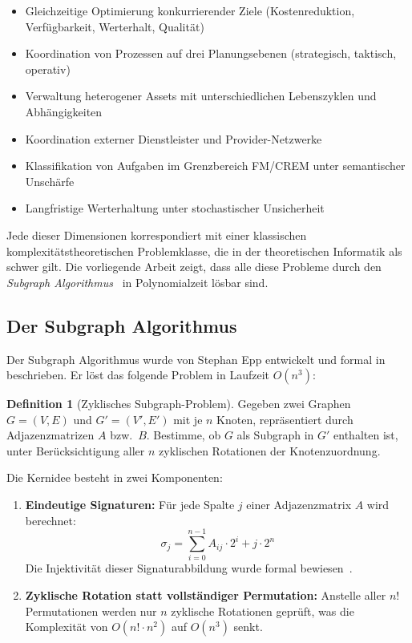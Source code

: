 ﻿\documentclass[a4paper,12pt]{article}
\theoremstyle{definition}
\newtheorem{definition}{Definition}[section]
\begin{document}
\begin{itemize}
    \item Gleichzeitige Optimierung konkurrierender Ziele (Kostenreduktion, Verfügbarkeit,
          Werterhalt, Qualität)
    \item Koordination von Prozessen auf drei Planungsebenen (strategisch, taktisch, operativ)
    \item Verwaltung heterogener Assets mit unterschiedlichen Lebenszyklen und Abhängigkeiten
    \item Koordination externer Dienstleister und Provider-Netzwerke
    \item Klassifikation von Aufgaben im Grenzbereich FM/CREM unter semantischer Un\-schärfe
    \item Langfristige Werterhaltung unter stochastischer Unsicherheit
\end{itemize}

Jede dieser Dimensionen korrespondiert mit einer klassischen komplexitätstheoretischen
Problemklasse, die in der theoretischen Informatik als schwer gilt.
Die vorliegende Arbeit zeigt, dass alle diese Probleme durch den
\emph{Subgraph Algorithmus}~\cite{epp2026subgraph} in Polynomialzeit lösbar sind.

\subsection{Der Subgraph Algorithmus}

Der Subgraph Algorithmus wurde von Stephan Epp entwickelt und formal in~\cite{epp2026subgraph}
beschrieben. Er löst das folgende Problem in Laufzeit $O(n^3)$:

\begin{definition}[Zyklisches Subgraph-Problem]
\label{def:zsub}
Gegeben zwei Graphen $G = (V, E)$ und $G' = (V', E')$ mit je $n$ Knoten,
repräsentiert durch Adjazenzmatrizen $A$ bzw.\ $B$.
Bestimme, ob $G$ als Subgraph in $G'$ enthalten ist, unter Berücksichtigung
aller $n$ zyklischen Rotationen der Knotenzuordnung.
\end{definition}

Die Kernidee besteht in zwei Komponenten:
\begin{enumerate}
    \item \textbf{Eindeutige Signaturen:} Für jede Spalte $j$ einer Adjazenzmatrix $A$
          wird berechnet:
          \[
              \sigma_j = \sum_{i=0}^{n-1} A_{ij} \cdot 2^i + j \cdot 2^n
          \]
          Die Injektivität dieser Signaturabbildung wurde formal bewiesen~\cite{epp2026subgraph}.

    \item \textbf{Zyklische Rotation statt vollständiger Permutation:}
          Anstelle aller $n!$ Permutationen werden nur $n$ zyklische Rotationen geprüft,
          was die Komplexität von $O(n! \cdot n^2)$ auf $O(n^3)$ senkt.
\end{enumerate}
\end{document}
